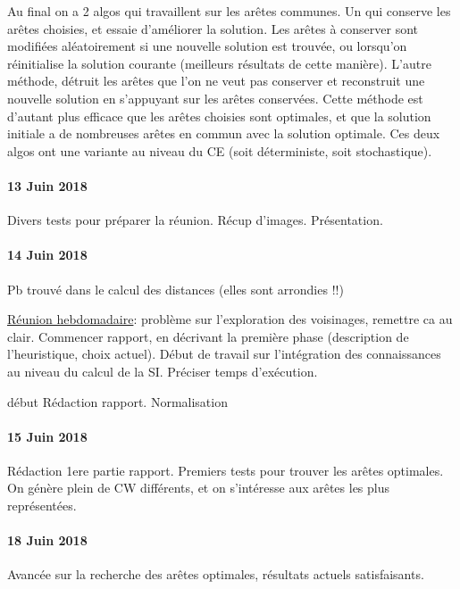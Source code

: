 \documentclass[a4paper,11pt]{article}%
\begin{document}
Au final on a 2 algos qui travaillent sur les arêtes communes. Un qui conserve les arêtes choisies, et essaie d'améliorer la solution. Les arêtes à conserver sont modifiées aléatoirement si une nouvelle solution est trouvée, ou lorsqu'on réinitialise la solution courante (meilleurs résultats de cette manière). 
L'autre méthode, détruit les arêtes que l'on ne veut pas conserver et reconstruit une nouvelle solution en s'appuyant sur les arêtes conservées. Cette méthode est d'autant plus efficace que les arêtes choisies sont optimales, et que la solution initiale a de nombreuses arêtes en commun avec la solution optimale.
Ces deux algos ont une variante au niveau du CE (soit déterministe, soit stochastique).
\paragraph*{13 Juin 2018}
Divers tests pour préparer la réunion. Récup d'images. Présentation.

\paragraph*{14 Juin 2018}
Pb trouvé dans le calcul des distances (elles sont arrondies !!)

\underline{Réunion hebdomadaire}: problème sur l'exploration des voisinages, remettre ca au clair. Commencer rapport, en décrivant la première phase (description de l'heuristique, choix actuel). Début de travail sur l'intégration des connaissances au niveau du calcul de la SI. Préciser temps d'exécution. 

début Rédaction rapport. Normalisation 

\paragraph*{15 Juin 2018}
Rédaction 1ere partie rapport. Premiers tests pour trouver les arêtes optimales. On génère plein de CW différents, et on s'intéresse aux arêtes les plus représentées.

\paragraph*{18 Juin 2018}
Avancée sur la recherche des arêtes optimales, résultats actuels satisfaisants. 
 
\end{document}

